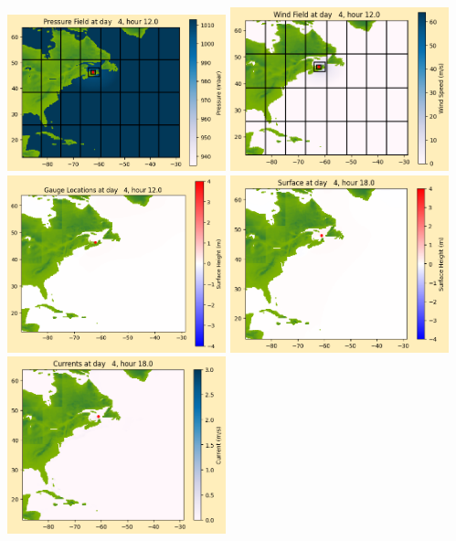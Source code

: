 \documentclass[11pt]{article}
\begin{document}
\includegraphics[width=0.475\textwidth]{frame0030fig1012.png}
\vskip 10pt 
\includegraphics[width=0.475\textwidth]{frame0030fig1013.png}
\includegraphics[width=0.475\textwidth]{frame0030fig1014.png}
\vskip 10pt 
\includegraphics[width=0.475\textwidth]{frame0031fig1001.png}
\includegraphics[width=0.475\textwidth]{frame0031fig1002.png}
\end{document}
